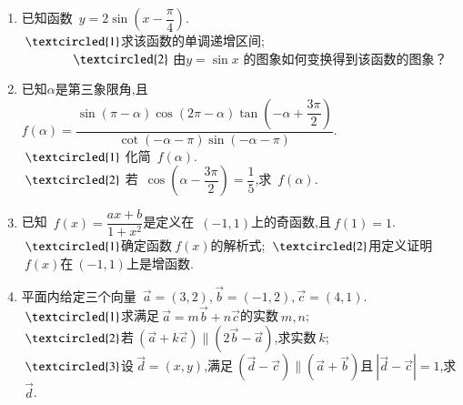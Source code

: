 \documentclass[cs4size,UTF8]{ctexart}
\begin{document}
\begin{spacing}{1.5}
\begin{enumerate}
\item 已知函数~$y=2\sin(x-\dfrac{\pi}{4})$.\\
 $~\textcircled{\footnotesize{1}}$求该函数的单调递增区间;\\~~~~~~~~$\textcircled{\footnotesize{2}}$ 由$y=\sin{x}$ 的图象如何变换得到该函数的图象？			
\vspace{6cm}			


\item 已知$\alpha$是第三象限角,且~$f(\alpha)=\dfrac{\sin(\pi-\alpha) \cos(2\pi-\alpha) \tan(-\alpha+\dfrac{3\pi}{2})}{\cot(-\alpha-\pi) \sin(-\alpha-\pi)}$.\\ 
$~\textcircled{\footnotesize{1}}$ 化简~$f(\alpha).$\\
$~\textcircled{\footnotesize{2}}$ 若~$\cos(\alpha-\dfrac{3\pi}{2})=\dfrac{1}{5}$,求~$f(\alpha)$.
\vspace{6cm}


\item 已知~$f(x)=\dfrac{ax+b}{1+x^2}$是定义在~$(-1,1)$上的奇函数,且$~f(1)=1$.\\
$~\textcircled{\footnotesize{1}}$确定函数$~f(x)$的解析式;
$~\textcircled{\footnotesize{2}}$用定义证明$~f(x)$在$~(-1,1)$上是增函数.
\vspace{10cm}			


\item 平面内给定三个向量~$\overrightarrow{a}=(3,2),\overrightarrow{b}=(-1,2),\overrightarrow{c}=(4,1)$.\\
$~\textcircled{\footnotesize{1}}$求满足$~\overrightarrow{a}=m\overrightarrow{b}+n\overrightarrow{c}$的实数$~m,n$;\\
$~\textcircled{\footnotesize{2}}$若$~(\overrightarrow{a}+k\overrightarrow{c})\parallel(2\overrightarrow{b}-\overrightarrow{a})$,求实数$~k$;\\
$~\textcircled{\footnotesize{3}}$设$~\overrightarrow{d}=(x,y)$,满足$~(\overrightarrow{d}-\overrightarrow{c})\parallel (\overrightarrow{a}+\overrightarrow{b})$且$~|\overrightarrow{d}-\overrightarrow{c}|=1$,求$~\overrightarrow{d}$.			


\end{enumerate}
\end{spacing}
\clearpage
	
\end{document}

